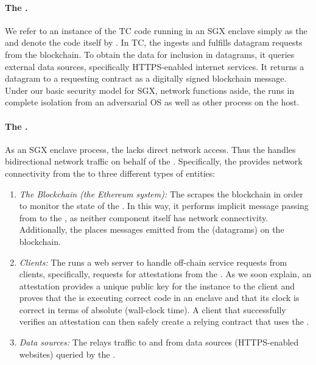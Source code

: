 \vspace{-2mm}
\paragraph{The \encname.}
We refer to an instance of the TC code running in an SGX enclave simply as the \encname and denote the code itself by  \engine. In TC, the \encname ingests and fulfills datagram requests from the blockchain. To obtain the data for inclusion in datagrams, it queries external data sources, specifically HTTPS-enabled internet services. It returns a datagram to a requesting contract \reqcont as a digitally signed blockchain message. Under our basic security model for SGX, network functions aside, the \encname runs in complete isolation from an adversarial OS as well as other process on the host. 

\vspace{-2mm}
\paragraph{The \medname \relay.} As an SGX enclave process, the \encname lacks direct network access. Thus the \medname handles bidirectional network traffic on behalf of the \encname. Specifically, the \medname provides network connectivity from the \encname to three different types of entities: 

\begin{enumerate}
\item {\em The Blockchain (the Ethereum system):}  The \medname scrapes the blockchain in order to monitor the state of the \tcontract  \tcont. In this way, it performs implicit message passing from \tcont to the \encname, as neither component itself has network connectivity. Additionally, the \medname places messages emitted from the \encname (datagrams) on the blockchain.
\item {\em Clients:} The \medname runs a web server to handle off-chain service requests from clients, specifically, requests for attestations from the \encname. As we soon explain, an attestation provides a unique public key for the \encname instance to the  client and proves that the \encname is executing correct code in an enclave and that its clock is correct in terms of absolute (wall-clock time). A client that successfully verifies an attestation can then safely create a relying contract \reqcont that uses the \tc.
\item {\em Data sources:} The \medname relays traffic to and from data sources (HTTPS-enabled websites) queried by the \encname. 
\end{enumerate}

